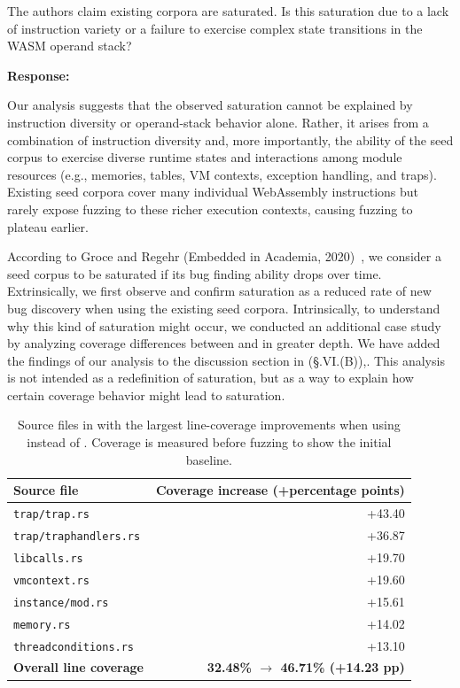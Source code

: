 \documentclass[11pt]{article}
\newenvironment{response}{%
    \par\vspace{10pt}
    \par\noindent\textbf{\color{tseblue}Response:}\par\nobreak\ignorespaces
}{%
    \par\vspace{15pt}
}
\newcounter{reviewernum}
\newcounter{cmtcounter}[reviewernum]
\newenvironment{rcomment}{%
    \stepcounter{cmtcounter}%
    \begin{revcomment}[R\thereviewernum{}.C\thecmtcounter{}.~Reviewer~\thereviewernum{}, Comment~\thecmtcounter]
}{%
    \end{revcomment}
}
\begin{document}
\newpage

\begin{rcomment}
    The authors claim existing corpora are saturated. Is this saturation due to a lack of instruction variety or a failure to exercise complex state transitions in the WASM operand stack?
\end{rcomment}
\begin{response}
    Our analysis suggests that the observed saturation cannot be explained by instruction diversity or operand-stack behavior alone. Rather, it arises from a combination of instruction diversity and, more importantly, the ability of the seed corpus to exercise diverse runtime states and interactions among module resources (e.g., memories, tables, VM contexts, exception handling, and traps). Existing seed corpora cover many individual WebAssembly instructions but rarely expose fuzzing to these richer execution contexts, causing fuzzing to plateau earlier.

    According to Groce and Regehr (Embedded in Academia, 2020)~\cite{groce2020saturation}, we consider a seed corpus to be saturated if its bug finding ability drops over time. Extrinsically, we first observe and confirm saturation as a reduced rate of new bug discovery when using the existing seed corpora. Intrinsically, to understand why this kind of saturation might occur, we conducted an additional case study by analyzing coverage differences between \rtbench{} and \wasmbench{} in greater depth. We have added the findings of our analysis to the discussion section in (§.VI.(B)),. This analysis is not intended as a redefinition of saturation, but as a way to explain how certain coverage behavior might lead to saturation. 

    \begin{table}[t]
        \centering
        \small
        \caption{Source files in \wasmer{} with the largest line-coverage improvements when using \rtbench{} instead of \wasmbench{}. Coverage is measured before fuzzing to show the initial baseline.}
        \label{tab:wasmer_rtbench_coverage}
        \begin{tabular}{l r}
        \toprule
        \textbf{Source file} & \textbf{Coverage increase (+percentage points)} \\
        \midrule
        \texttt{trap/trap.rs} & +43.40 \\
        \texttt{trap/traphandlers.rs} & +36.87 \\
        \texttt{libcalls.rs} & +19.70 \\
        \texttt{vmcontext.rs} & +19.60 \\
        \texttt{instance/mod.rs} & +15.61 \\
        \texttt{memory.rs} & +14.02 \\
        \texttt{threadconditions.rs} & +13.10 \\
        \midrule
        \textbf{Overall \wasmer{} line coverage} & \textbf{32.48\% $\rightarrow$ 46.71\% (+14.23 pp)} \\
        \bottomrule
        \end{tabular}
    \end{table}
    

\end{response}
\end{document}
